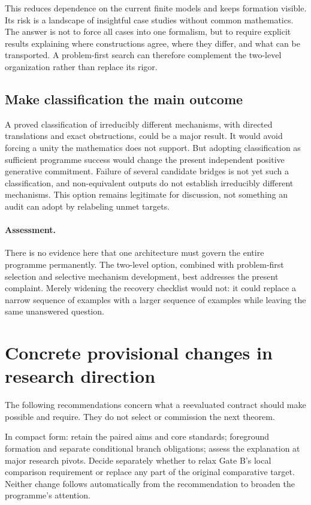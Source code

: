 \documentclass[11pt]{article}
\begin{document}
This reduces dependence on the current finite models and keeps formation visible. Its risk is a landscape of insightful case studies without common mathematics. The answer is not to force all cases into one formalism, but to require explicit results explaining where constructions agree, where they differ, and what can be transported. A problem-first search can therefore complement the two-level organization rather than replace its rigor.

\subsection{Make classification the main outcome}

A proved classification of irreducibly different mechanisms, with directed translations and exact obstructions, could be a major result. It would avoid forcing a unity the mathematics does not support. But adopting classification as sufficient programme success would change the present independent positive generative commitment. Failure of several candidate bridges is not yet such a classification, and non-equivalent outputs do not establish irreducibly different mechanisms. This option remains legitimate for discussion, not something an audit can adopt by relabeling unmet targets.

\paragraph{Assessment.}
There is no evidence here that one architecture must govern the entire programme permanently. The two-level option, combined with problem-first selection and selective mechanism development, best addresses the present complaint. Merely widening the recovery checklist would not: it could replace a narrow sequence of examples with a larger sequence of examples while leaving the same unanswered question.

\section{Concrete provisional changes in research direction}
\label{sec:recommendations}

The following recommendations concern what a reevaluated contract should make possible and require. They do not select or commission the next theorem.

In compact form: retain the paired aims and core standards; foreground formation and separate conditional branch obligations; assess the explanation at major research pivots. Decide separately whether to relax Gate B's local comparison requirement or replace any part of the original comparative target. Neither change follows automatically from the recommendation to broaden the programme's attention.
\end{document}
